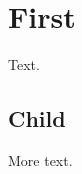 \documentclass{article}
\begin{document}
\tableofcontents
\section{First}
Text.
\subsection{Child}
More text.
\end{document}
